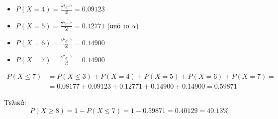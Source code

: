 \documentclass[11pt,a4paper]{article}
\begin{document}
\begin{itemize}
    \item $P(X=4) = \frac{7^4 e^{-7}}{4!} = 0.09123$
    \item $P(X=5) = \frac{7^5 e^{-7}}{5!} = 0.12771$ (από το $\alpha$)
    \item $P(X=6) = \frac{7^6 e^{-7}}{6!} = 0.14900$
    \item $P(X=7) = \frac{7^7 e^{-7}}{7!} = 0.14900$
\end{itemize}
\begin{align*}
P(X \le 7) &= P(X \le 3) + P(X=4) + P(X=5) + P(X=6) + P(X=7)=\\
&= 0.08177 + 0.09123 + 0.12771 + 0.14900 + 0.14900= 0.59871
\end{align*}

Τελικά:
$$P(X \ge 8) = 1 - P(X \le 7) = 1 - 0.59871 = 0.40129=40.13\%$$
\end{document}

